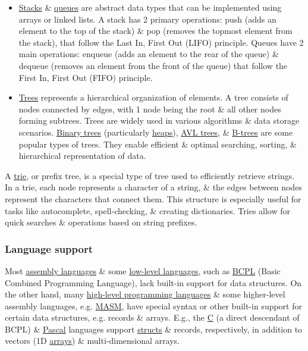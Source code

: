\documentclass{article}
\begin{document}
\begin{itemize}
	\item \href{https://en.wikipedia.org/wiki/Stack_(abstract_data_type)}{Stacks} \& \href{https://en.wikipedia.org/wiki/Queue_(abstract_data_type)}{queues} are abstract data types that can be implemented using arrays or linked lists. A stack has 2 primary operations: push (adds an element to the top of the stack) \& pop (removes the topmost element from the stack), that follow the Last In, First Out (LIFO) principle. Queues have 2 main operations: enqueue (adds an element to the rear of the queue) \& dequeue (removes an element from the front of the queue) that follow the First In, First Out (FIFO) principle.
	\item \href{https://en.wikipedia.org/wiki/Tree_(data_structure)}{Trees} represents a hierarchical organization of elements. A tree consists of nodes connected by edges, with 1 node being the root \& all other nodes forming subtrees. Trees are widely used in various algorithms \& data storage scenarios. \href{https://en.wikipedia.org/wiki/Binary_tree}{Binary trees} (particularly \href{https://en.wikipedia.org/wiki/Heap_(data_structure)}{heaps}), \href{https://en.wikipedia.org/wiki/AVL_tree}{AVL trees}, \& \href{https://en.wikipedia.org/wiki/B-tree}{B-trees} are some popular types of trees. They enable efficient \& optimal searching, sorting, \& hierarchical representation of data.
\end{itemize}
A \href{https://en.wikipedia.org/wiki/Trie}{trie}, or prefix tree, is a special type of tree used to efficiently retrieve strings. In a trie, each node represents a character of a string, \& the edges between nodes represent the characters that connect them. This structure is especially useful for tasks like autocomplete, spell-checking, \& creating dictionaries. Tries allow for quick searches \& operations based on string prefixes.

\subsubsection{Language support}
Most \href{https://en.wikipedia.org/wiki/Assembly_language}{assembly languages} \& some \href{https://en.wikipedia.org/wiki/Low-level_programming_language}{low-level languages}, such as \href{https://en.wikipedia.org/wiki/BCPL}{BCPL} (Basic Combined Programming Language), lack built-in support for data structures. On the other hand, many \href{https://en.wikipedia.org/wiki/High-level_programming_language}{high-level programming languages} \& some higher-level assembly languages, e.g. \href{https://en.wikipedia.org/wiki/MASM}{MASM}, have special syntax or other built-in support for certain data structures, e.g. records \& arrays. E.g., the \href{https://en.wikipedia.org/wiki/C_(programming_language)}{C} (a direct descendant of BCPL) \& \href{https://en.wikipedia.org/wiki/Pascal_(programming_language)}{Pascal} languages support \href{https://en.wikipedia.org/wiki/Record_(computer_science)}{structs} \& records, respectively, in addition to vectors (1D \href{https://en.wikipedia.org/wiki/Array_data_type}{arrays}) \& multi-dimensional arrays.
\end{document}
